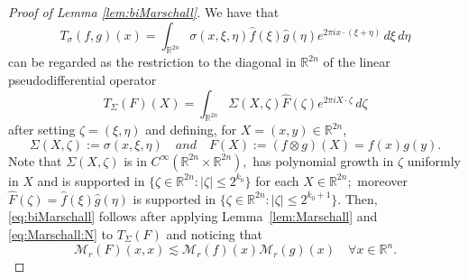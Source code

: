 \documentclass[final,letterpaper,12pt,oneside]{class_diss}
\theoremstyle{remark}
\newtheorem{remark}{Remark}[section]
\newcommand{\re}{\mathbb{R}}
\newcommand{\rn}{{{\mathbb R}^n}}
\newcommand{\rtn}{\re^{2n}}
\newcommand{\fhat}{\widehat{f}}
\newcommand{\ghat}{\widehat{g}}
\newcommand{\eixxe}{e^{2\pi i x \cdot (\xi + \eta)}}
\newcommand{\dxi}{\, d\xi}
\newcommand{\deta}{\, d\eta}
\newcommand{\dzeta}{\, d\zeta}
\newcommand{\abs}[1]{\left\vert #1 \right\vert}
\newcommand{\norm}[2]{\left\|#1\right\|_{#2}}
\begin{document}
\begin{proof}[Proof of Lemma \ref{lem:biMarschall}]
 We have that
$$
T_{\sigma}(f,g)(x) = \int_{\rtn} \sigma(x, \xi, \eta) \fhat(\xi) \ghat(\eta) \eixxe\dxi\deta
$$
can be regarded as the restriction to the diagonal in $\re^{2n}$ of the linear pseudodifferential operator
$$
T_\Sigma(F)(X) = \int_{\re^{2n}} \Sigma(X, \zeta) \widehat{F}(\zeta) e^{2\pi i X \cdot \zeta } \dzeta
$$
after setting $\zeta=(\xi, \eta)$ and defining, for $X = (x, y) \in \re^{2n}$, 
$$
\Sigma(X, \zeta) :=\sigma(x, \xi, \eta)\quad and \quad F(X):= (f\otimes g) (X)=f(x)g(y).
$$
Note that $\Sigma(X, \zeta)$ is in $C^\infty(\rtn\times \rtn),$  has polynomial growth in $\zeta$ uniformly in $X$ and  is supported in $\{\zeta\in\re^{2n}: \abs{\zeta}\le 2^{k_0}\}$ for each $X\in \rtn;$ moreover $\widehat{F}(\zeta) =  \widehat{f}(\xi) \widehat{g}(\eta)$ is supported in $\{\zeta \in \re^{2n}: |\zeta| \leq 2^{k_0+1} \}.$ Then, \eqref{eq:biMarschall} follows after applying Lemma~\ref{lem:Marschall}  and \eqref{eq:Marschall:N} to $T_{\Sigma}(F)$ and noticing that 
\[
\mathcal{M}_r(F)(x, x)\lesssim \mathcal{M}_r(f)(x)\mathcal{M}_r(g)(x)\quad \forall x\in\rn.
\]
\end{proof}

\end{document}
